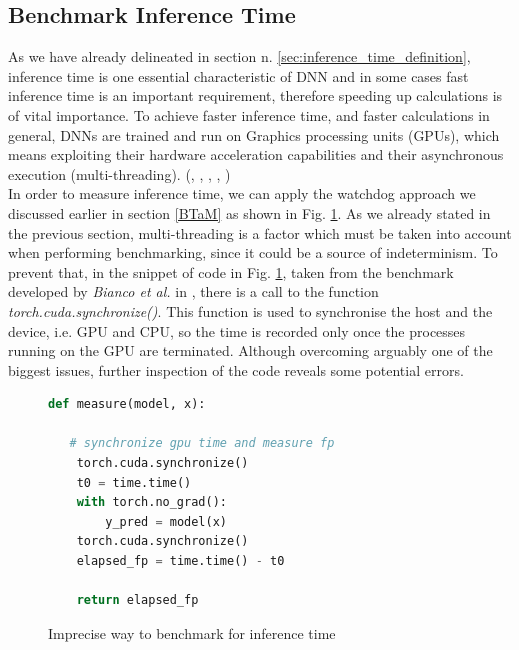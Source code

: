 \subsection{Benchmark Inference Time}\label{sec:ben_inf}
As we have already delineated in section n. \ref{sec:inference_time_definition}, inference time is one essential characteristic of DNN and in some cases fast inference time is an important requirement, therefore speeding up calculations is of vital importance. To achieve faster inference time, and faster calculations in general, DNNs are trained and run on Graphics processing units (GPUs), which means exploiting their hardware acceleration capabilities and their asynchronous execution (multi-threading).  (\cite{8090194}, \cite{10.1007/978-3-642-04274-4_39}, \cite{10.1145/3089801.3089804}, \cite{paine2013gpu}, \cite{OH20041311})\\
In order to measure inference time, we can apply the watchdog approach we discussed earlier in section \ref{BTaM} as shown in Fig. \ref{fig:wrong_inf}. As we already stated in the previous section, multi-threading is a factor which must be taken into account when performing benchmarking, since it could be a source of indeterminism. To prevent that, in the snippet of code in Fig. \ref{fig:wrong_inf}, taken from the benchmark developed by \textit{Bianco et al.} in \cite{bianco2018dnnsbench}, there is a call to the function \textit{torch.cuda.synchronize()}. This function is used to synchronise the host and the device, i.e. GPU and CPU, so the time is recorded only once the processes running on the GPU are terminated. Although overcoming arguably one of the biggest issues, further inspection of the code reveals some potential errors.\\
\begin{figure}[h]
\begin{lstlisting}[language=python]
def measure(model, x):

   # synchronize gpu time and measure fp
	torch.cuda.synchronize()
	t0 = time.time()
	with torch.no_grad():
		y_pred = model(x)
	torch.cuda.synchronize()
	elapsed_fp = time.time() - t0
	
	return elapsed_fp

\end{lstlisting}
\caption[Imprecise way to benchmark for inference time]{Imprecise way to benchmark for inference time \cite{bianco2018dnnsbench}}
\label{fig:wrong_inf}
\end{figure}




